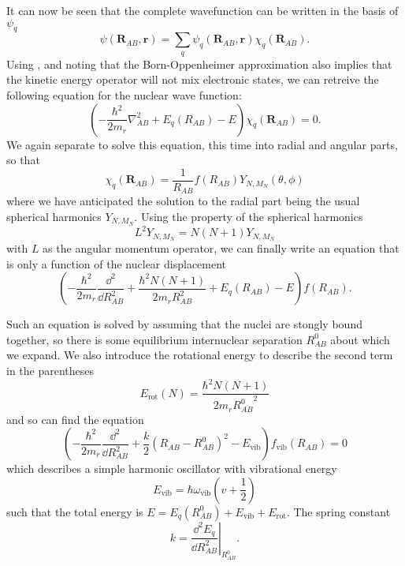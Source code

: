 It can now be seen that the complete wavefunction can be written in the basis
of $\psi_q$
%
\begin{equation}
  \psi(\mathbf{R}_{AB}, \mathbf{r}) = \sum_q \psi_q(\mathbf{R}_{AB},
  \mathbf{r}) \chi_q(\mathbf{R}_{AB}).
\end{equation}
%
Using , and noting that the Born-Oppenheimer
approximation also implies that the kinetic energy operator will not mix
electronic states, we can retreive the following equation for the nuclear wave
function:
%
\begin{equation}
  \left(-\frac{\hbar^2}{2m_r}\nabla_{AB}^2 + E_q(R_{AB}) -
  E\right)\chi_q(\mathbf{R}_{AB}) = 0.
\end{equation}
%
We again separate to solve this equation, this time into radial and angular
parts, so that
%
\begin{equation}
  \chi_q(\mathbf{R}_{AB}) = \frac{1}{R_{AB}}f(R_{AB})Y_{N,M_N}(\theta, \phi)
\end{equation}
%
where we have anticipated the solution to the radial part being the usual
spherical harmonics $Y_{N, M_N}$. Using the property of the spherical harmonics
%
\begin{equation}
  L^2 Y_{N, M_N} = N(N+1)Y_{N, M_N}
\end{equation}
%
with $L$ as the angular momentum operator, we can finally write an equation
that is only a function of the nuclear displacement
%
\begin{equation}
  \left(-\frac{\hbar^2}{2m_r}\frac{\dd^2}{\dd R_{AB}^2} +
    \frac{\hbar^2 N(N+1)}{2m_rR_{AB}^2} + E_q(R_{AB}) - E\right)f(R_{AB}).
\end{equation}

Such an equation is solved by assuming that the nuclei are stongly bound
together, so there is some equilibrium internuclear separation $R^0_{AB}$ about
which we expand. We also introduce the rotational energy to describe the
second term in the parentheses
%
\begin{equation}
  E_\text{rot}(N) = \frac{\hbar^2 N(N+1)}{2 m_r {R^0_{AB}}^2}
  \label{theory:eqn:rotenergy}
\end{equation}
%
and so can find the equation
%
\begin{equation}
  \left(-\frac{\hbar^2}{2m_r} \frac{\dd^2}{\dd R_{AB}^2} + \frac{k}{2}(R_{AB} -
    R^0_{AB})^2 - E_\text{vib}\right)f_\text{vib}(R_{AB})=0
\end{equation}
%
which describes a simple harmonic oscillator with vibrational energy
%
\begin{equation}
  E_\text{vib} = \hbar\omega_\text{vib}\left(v + \frac{1}{2}\right)
\end{equation}
%
such that the total energy is $E = E_q(R_{AB}^0) + E_\text{vib} +
E_\text{rot}$. The spring constant
%
\begin{equation}
  k = \left.\frac{\dd^2 E_q}{\dd R_{AB}^2}\right\rvert_{R_{AB}^0}.
\end{equation}

